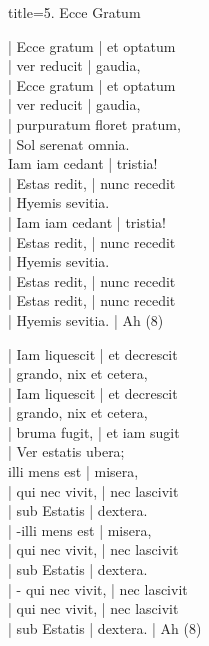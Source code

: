 \newpage
\begin{song}{title={5. Ecce Gratum}}

  \par\nobreak
  \startline| Ecce gratum | et optatum\\
  \startline| ver reducit | gaudia,\\
  \startline| Ecce gratum | et optatum\\
  \startline {}| ver reducit | gaudia,\\
  \startline {}| purpuratum floret pratum,\\
  \startline| Sol serenat omnia.\\
  \startline{} Iam iam cedant | tristia!\\
  \startline| Estas redit, | nunc recedit\\
  \startline|  Hyemis sevitia.\\
  \startline| Iam iam cedant | tristia!\\
  \startline| Estas redit, | nunc recedit\\
  \startline| Hyemis sevitia.\\
  \startline| Estas redit, | nunc recedit\\
  \startline| Estas redit, | nunc recedit\\
  \startline| Hyemis sevitia. | Ah (8)\\

  \vspace{3.5\baselineskip}
  \par\nobreak
  \startline| Iam liquescit | et decrescit\\
  \startline| grando, nix et cetera,\\
  \startline| Iam liquescit | et decrescit\\
  \startline|  grando, nix et cetera,\\
  \startline{} | bruma fugit, | et iam sugit\\
  \startline| Ver estatis ubera;\\
  \columnbreak
  \startline{} illi mens est | misera,\\
  \startline| qui nec vivit, | nec lascivit\\
  \startline| sub Estatis | dextera.\\
  \startline| \chord-{}illi mens est | misera,\\
  \startline| qui nec vivit, | nec lascivit\\
  \startline| sub Estatis | dextera.\\
  \startline| \chord-{} qui nec vivit, | nec lascivit\\
  \startline| qui nec vivit, | nec lascivit\\
  \startline| sub Estatis | dextera. | Ah (8)\\


\end{song}

